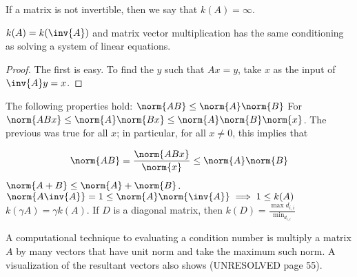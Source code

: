 \documentclass[../main.tex]{subfiles}
\begin{document}
\begin{definition}
    If a matrix is not invertible, then we say that $k(A) = \infty$.
\end{definition}

\begin{proposition}
    $k(A) = k(\inv{A})$ and matrix vector multiplication has the same conditioning as solving a system of linear equations.
\end{proposition}

\begin{proof}
    The first is easy. To find the $y$ such that $Ax = y$, take $x$ as the input of $\inv{A}y = x$.
\end{proof}

\begin{proposition}
    \begin{outline}
        \1 The following properties hold:
        \2 $\norm{AB} \leq \norm{A} \norm{B}$
        \3 For $\norm{ABx} \leq \norm{A}\norm{Bx} \leq \norm{A} \norm{B} \norm{x}$. The previous was true for all $x$; in particular,
        for all $x \not = 0$, this implies that

        \[
            \norm{AB} = \frac{\norm{ABx}}{\norm{x}} \leq \norm{A}\norm{B}
        \]
        \2 $\norm{A + B} \leq \norm{A} + \norm{B}$.
        \2 $\norm{A \inv{A}} = 1 \leq \norm{A} \norm{\inv{A}} \implies 1 \leq k(A)$
        \1 $k(\gamma A) = \gamma k(A)$.
        \1 If $D$ is a diagonal matrix, then $k(D) = \frac{\max{d_{i,i}}}{\min_{d_{i,i}}}$
    \end{outline}
\end{proposition}

\begin{remark}
    A computational technique to evaluating a condition number is multiply a matrix $A$ by many vectors that have unit norm and take
    the maximum such norm. A visualization of the resultant vectors also shows (UNRESOLVED page 55). 
\end{remark}
\end{document}
